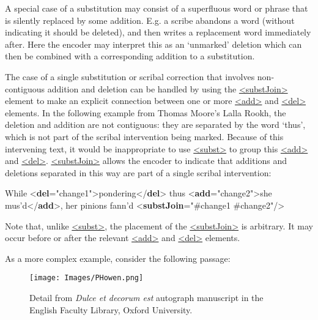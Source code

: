 A special case of a substitution may consist of a superfluous word or phrase that is silently replaced by some addition. E.g. a scribe abandons a word (without indicating it should be deleted), and then writes a replacement word immediately after. Here the encoder may interpret this as an ‘unmarked’ deletion which can then be combined with a corresponding addition to a substitution.\par
The case of a single substitution or scribal correction that involves non-contiguous addition and deletion can be handled by using the \hyperref[TEI.substJoin]{<substJoin>} element to make an explicit connection between one or more \hyperref[TEI.add]{<add>} and \hyperref[TEI.del]{<del>} elements. In the following example from Thomas Moore's Lalla Rookh, the deletion and addition are not contiguous: they are separated by the word ‘thus’, which is not part of the scribal intervention being marked. Because of this intervening text, it would be inappropriate to use \hyperref[TEI.subst]{<subst>} to group this \hyperref[TEI.add]{<add>} and \hyperref[TEI.del]{<del>}. \hyperref[TEI.substJoin]{<substJoin>} allows the encoder to indicate that additions and deletions separated in this way are part of a single scribal intervention: \par\bgroup{}\exampleFont \begin{shaded}\noindent\mbox{} While {<\textbf{del}\hspace*{1em}{xml:id}="{change1}">}pondering{</\textbf{del}>} thus {<\textbf{add}\hspace*{1em}{xml:id}="{change2}">}she mus'd{</\textbf{add}>}, her pinions\mbox{}\newline 
 fann'd\mbox{}\newline 
{<\textbf{substJoin}\hspace*{1em}{target}="{\#change1 \#change2}"/>}\end{shaded}\egroup\par \noindent  Note that, unlike \hyperref[TEI.subst]{<subst>}, the placement of the \hyperref[TEI.substJoin]{<substJoin>} is arbitrary. It may occur before or after the relevant \hyperref[TEI.add]{<add>} and \hyperref[TEI.del]{<del>} elements.\par
As a more complex example, consider the following passage: \begin{figure}[htbp]
\noindent\noindent\texttt{[image: Images/PHowen.png]}
\caption{Detail from \textit{Dulce et decorum est} autograph manuscript in the English Faculty Library, Oxford University.}\end{figure}
